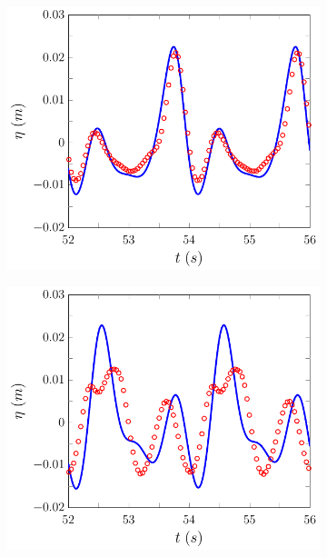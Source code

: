 %
\begin{figure}
	\centering
	\begin{subfigure}{0.5\textwidth}
		\includegraphics[width=\textwidth]{./chp6/figures/Experiment/Beji/sl/FDVMWG5.pdf}
		\vspace{0.5cm}
	\end{subfigure}%
	\begin{subfigure}{0.5\textwidth}
		\includegraphics[width=\textwidth]{./chp6/figures/Experiment/Beji/sl/FDVMWG6.pdf}

\end{subfigure}
\end{figure}
